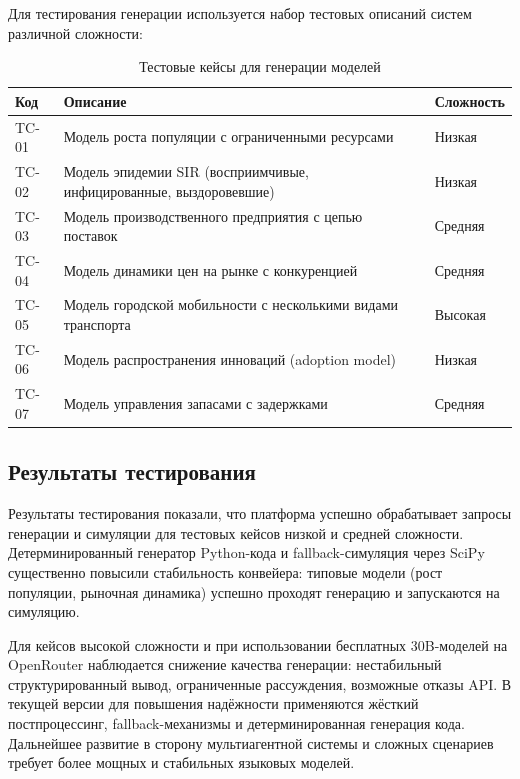Для тестирования генерации используется набор тестовых описаний систем различной сложности:

\begin{table}[H]
    \centering
    \caption{Тестовые кейсы для генерации моделей}
    \label{tab:test-cases}
    \begin{tabular}{|p{1.8cm}|p{10cm}|p{2cm}|}
        \hline
        \textbf{Код} & \textbf{Описание} & \textbf{Сложность} \\
        \hline
        TC-01 & Модель роста популяции с ограниченными ресурсами & Низкая \\
        \hline
        TC-02 & Модель эпидемии SIR (восприимчивые, инфицированные, выздоровевшие) & Низкая \\
        \hline
        TC-03 & Модель производственного предприятия с цепью поставок & Средняя \\
        \hline
        TC-04 & Модель динамики цен на рынке с конкуренцией & Средняя \\
        \hline
        TC-05 & Модель городской мобильности с несколькими видами транспорта & Высокая \\
        \hline
        TC-06 & Модель распространения инноваций (adoption model) & Низкая \\
        \hline
        TC-07 & Модель управления запасами с задержками & Средняя \\
        \hline
    \end{tabular}
\end{table}

\subsection{Результаты тестирования}

Результаты тестирования показали, что платформа успешно обрабатывает запросы генерации и симуляции для тестовых кейсов низкой и средней сложности. Детерминированный генератор Python-кода и fallback-симуляция через SciPy существенно повысили стабильность конвейера: типовые модели (рост популяции, рыночная динамика) успешно проходят генерацию и запускаются на симуляцию.

Для кейсов высокой сложности и при использовании бесплатных 30B-моделей на OpenRouter наблюдается снижение качества генерации: нестабильный структурированный вывод, ограниченные рассуждения, возможные отказы API. В текущей версии для повышения надёжности применяются жёсткий постпроцессинг, fallback-механизмы и детерминированная генерация кода. Дальнейшее развитие в сторону мультиагентной системы и сложных сценариев требует более мощных и стабильных языковых моделей.
